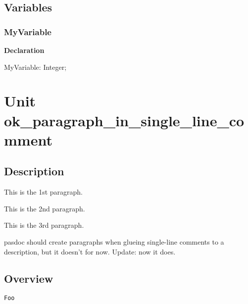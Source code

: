 \documentclass{report}
\newif\ifpdf
\begin{document}
\section{Variables}
\ifpdf
\subsection*{\large{\textbf{MyVariable}}\normalsize\hspace{1ex}\hrulefill}
\else
\subsection*{MyVariable}
\fi
\label{ok_nodescription_printing-MyVariable}
\begin{list}{}{
\setlength{\itemindent}{0cm}
\setlength{\listparindent}{0cm}
\setlength{\leftmargin}{\evensidemargin}
\addtolength{\leftmargin}{\tmplength}
\settowidth{\labelsep}{X}
\addtolength{\leftmargin}{\labelsep}
\setlength{\labelwidth}{\tmplength}
}
\item[\textbf{Declaration}\hfill]
\ifpdf
\begin{flushleft}
\fi
\begin{ttfamily}
MyVariable: Integer;\end{ttfamily}

\ifpdf
\end{flushleft}
\fi

\end{list}
\chapter{Unit ok{\_}paragraph{\_}in{\_}single{\_}line{\_}comment}
\label{ok_paragraph_in_single_line_comment}
\section{Description}
This is the 1st paragraph.

This is the 2nd paragraph.

This is the 3rd paragraph.

pasdoc should create paragraphs when glueing single{-}line comments to a description, but it doesn't for now. Update: now it does.
\section{Overview}
\begin{description}
\item[\texttt{Foo}]
\end{description}
\end{document}
